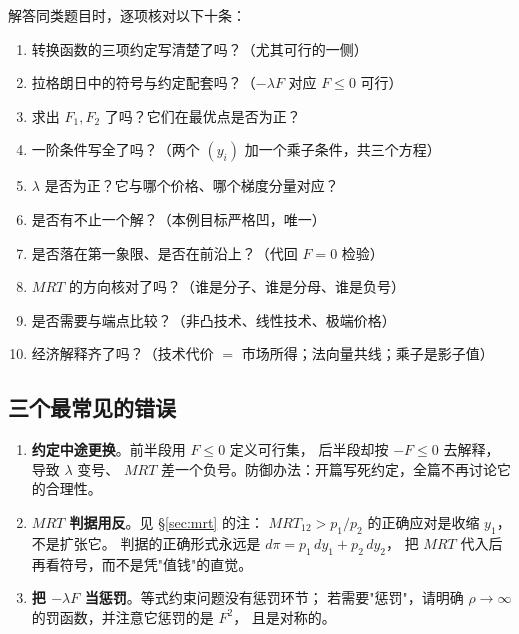 解答同类题目时，逐项核对以下十条：

\begin{enumerate}
  \item 转换函数的三项约定写清楚了吗？（尤其可行的一侧）
  \item 拉格朗日中的符号与约定配套吗？（$-\lambda F$ 对应 $F\le 0$ 可行）
  \item 求出 $F_1,F_2$ 了吗？它们在最优点是否为正？
  \item 一阶条件写全了吗？（两个 $(y_i)$ 加一个乘子条件，共三个方程）
  \item $\lambda$ 是否为正？它与哪个价格、哪个梯度分量对应？
  \item 是否有不止一个解？（本例目标严格凹，唯一）
  \item 是否落在第一象限、是否在前沿上？（代回 $F=0$ 检验）
  \item $MRT$ 的方向核对了吗？（谁是分子、谁是分母、谁是负号）
  \item 是否需要与端点比较？（非凸技术、线性技术、极端价格）
  \item 经济解释齐了吗？（技术代价 $=$ 市场所得；法向量共线；乘子是影子值）
\end{enumerate}

\subsection{三个最常见的错误}

\begin{enumerate}
  \item \textbf{约定中途更换}。前半段用 $F\le 0$ 定义可行集，
        后半段却按 $-F\le 0$ 去解释，导致 $\lambda$ 变号、
        $MRT$ 差一个负号。防御办法：开篇写死约定，全篇不再讨论它的合理性。
  \item \textbf{$MRT$ 判据用反}。见 \S\ref{sec:mrt} 的注：
        $MRT_{12}>p_1/p_2$ 的正确应对是收缩 $y_1$，不是扩张它。
        判据的正确形式永远是 $d\pi=p_1\,dy_1+p_2\,dy_2$，
        把 $MRT$ 代入后再看符号，而不是凭"值钱"的直觉。
  \item \textbf{把 $-\lambda F$ 当惩罚}。等式约束问题没有惩罚环节；
        若需要"惩罚"，请明确 $\rho\to\infty$ 的罚函数，并注意它惩罚的是 $F^{2}$，
        且是对称的。
\end{enumerate}
